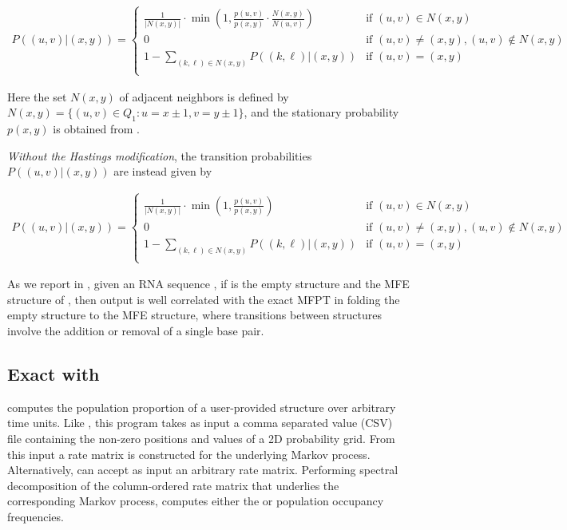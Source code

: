 \begin{align}
\label{eq:hermes:xitionProbFfttwoWithHastings}
P((u,v)|(x,y))=
\begin{cases}
\frac{1}{|N(x,y)|} \cdot \min\left(1, \frac{p(u,v)}{p(x,y)} \cdot
\frac{N(x,y)}{N(u,v)}\right) & \text{if $(u,v) \in N(x,y)$} \\
0 &\text{if $(u,v) \ne (x,y), (u,v) \not\in N(x,y)$} \\
1 - \sum_{(k,\ell) \in N(x,y)} P((k,\ell)|(x,y)) & \text{if $(u,v)=(x,y)$} \\
\end{cases}
\end{align}

Here the set $N(x,y)$ of adjacent neighbors is defined by $N(x,y) = \{
(u,v) \in Q_1 : u = x \pm 1, v = y \pm 1 \}$, and the stationary
probability $p(x,y)$ is obtained from \ffttwo.

{\em Without the Hastings modification}, the transition probabilities
$P((u,v)|(x,y))$ are instead given by

\begin{align}
\label{eq:hermes:xitionProbFfttwoWithoutHastings}
P((u,v)|(x,y))=
\begin{cases}
\frac{1}{|N(x,y)|} \cdot \min\left(1, \frac{p(u,v)}{p(x,y)}\right)
& \text{if $(u,v) \in N(x,y)$} \\
0 &\text{if $(u,v) \ne (x,y), (u,v) \not\in N(x,y)$} \\
1 - \sum_{(k,\ell) \in N(x,y)} P((k,\ell)|(x,y)) & \text{if $(u,v)=(x,y)$} \\
\end{cases}
\end{align}

As we report in ,
given an RNA
sequence \seq, if \strA is the empty structure and \strB the MFE
structure of \seq, then \fftmfpt output is well correlated with the
exact MFPT in folding the empty structure to the MFE structure, where
transitions between structures involve the addition or removal of a
single base pair.

\subsection{Exact \eqt with \rnaeq}
\label{subsec:hermes:rnaeq}

\rnaeq computes the population proportion of a user-provided structure
over arbitrary time units. Like \rnamfpt, this program takes as input a
comma separated value (CSV) file containing the non-zero positions and
values of a 2D probability grid. From this input a rate matrix
is constructed for the underlying Markov process. Alternatively,
\rnaeq can accept as input an arbitrary rate matrix. Performing
spectral decomposition of the column-ordered rate matrix that
underlies the corresponding Markov process, \rnaeq computes either
the \eqt or population occupancy frequencies.

